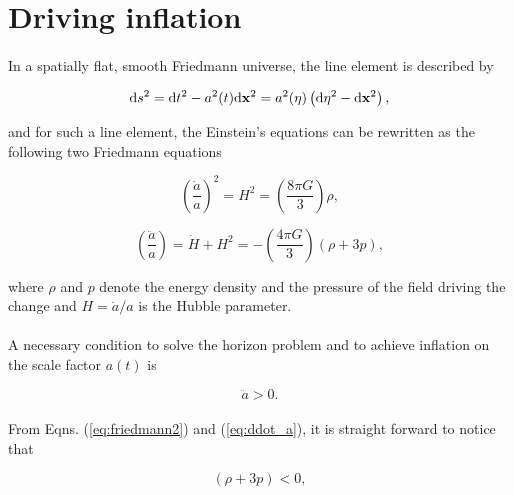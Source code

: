 \documentclass[12pt,a4paper,oneside]{book}
\begin{document}
\section{Driving inflation}

\paragraph*{} In a spatially flat, smooth Friedmann universe, the line 
element is described by

\begin{equation}
{\rm d}s^2 = {\rm d}t^2 - a^2(t){\rm d}{\bf x}^2 = 
a^2(\eta)\left({\rm d}\eta^2 - {\rm d}{\bf x}^2\right),
\end{equation}

\noindent and for such a line element, the Einstein's equations can be rewritten as 
the following two Friedmann equations

\begin{equation}\label{eq:friedmann1}
\left(\frac{\dot{a}}{a}\right)^2 = H^2 = 
\left(\frac{8\pi G}{3}\right)\rho,
\end{equation}

\begin{equation}\label{eq:friedmann2}
\left(\frac{\ddot{a}}{a}\right) = \dot{H} + H^2= 
-\left(\frac{4\pi G}{3}\right)(\rho + 3p),
\end{equation}

\noindent where $\rho$ and $p$ denote the energy density and the pressure of the 
field driving the change and $H=\dot{a}/a$ is the Hubble parameter.

\paragraph*{} A necessary condition to solve the horizon problem and to achieve 
inflation on the scale factor $a(t)$ is 

\begin{equation}\label{eq:ddot_a}
\ddot{a} > 0.
\end{equation}

\paragraph*{} From Eqns. (\ref{eq:friedmann2}) and (\ref{eq:ddot_a}), it 
is straight forward to notice that 

\begin{equation}
(\rho + 3p) < 0,
\end{equation}
\end{document}
